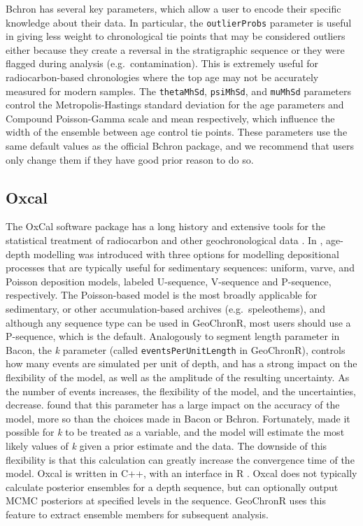 \documentclass[gchron, manuscript]{copernicus}
\begin{document}
Bchron has several key parameters, which allow a user to encode their specific knowledge about their data.
In particular, the \texttt{outlierProbs} parameter is useful in giving less weight to chronological tie points that may be considered outliers either because they create a reversal in the stratigraphic sequence or they were flagged during analysis (e.g.~contamination).
This is extremely useful for radiocarbon-based chronologies where the top age may not be accurately measured for modern samples.
The \texttt{thetaMhSd}, \texttt{psiMhSd}, and \texttt{muMhSd} parameters control the Metropolis-Hastings standard deviation for the age parameters and Compound Poisson-Gamma scale and mean respectively, which influence the width of the ensemble between age control tie points.
These parameters use the same default values as the official Bchron package, and we recommend that users only change them if they have good prior reason to do so.

\subsection{Oxcal}

The OxCal software package has a long history and extensive tools for the statistical treatment of radiocarbon and other geochronological data \citep{BronkRamsey95}.
In \citet{ramsey2008deposition}, age-depth modelling was introduced with three options for modelling depositional processes that are typically useful for sedimentary sequences: uniform, varve, and Poisson deposition models, labeled U-sequence, V-sequence and P-sequence, respectively.
The Poisson-based model is the most broadly applicable for sedimentary, or other accumulation-based archives (e.g.~speleothems), and although any sequence type can be used in GeoChronR, most users should use a P-sequence, which is the default.
Analogously to segment length parameter in Bacon, the \emph{k} parameter (called \texttt{eventsPerUnitLength} in GeoChronR), controls how many events are simulated per unit of depth, and has a strong impact on the flexibility of the model, as well as the amplitude of the resulting uncertainty.
As the number of events increases, the flexibility of the model, and the uncertainties, decrease.
\citet{trachsel2017} found that this parameter has a large impact on the accuracy of the model, more so than the choices made in Bacon or Bchron.
Fortunately, \citet{bronkramsey2010} made it possible for \emph{k} to be treated as a variable, and the model will estimate the most likely values of \emph{k} given a prior estimate and the data. The downside of this flexibility is that this calculation can greatly increase the convergence time of the model.
Oxcal is written in C++, with an interface in R \citep{oxcAAR}.
Oxcal does not typically calculate posterior ensembles for a depth sequence, but can optionally output MCMC posteriors at specified levels in the sequence.
GeoChronR uses this feature to extract ensemble members for subsequent analysis.
\end{document}
